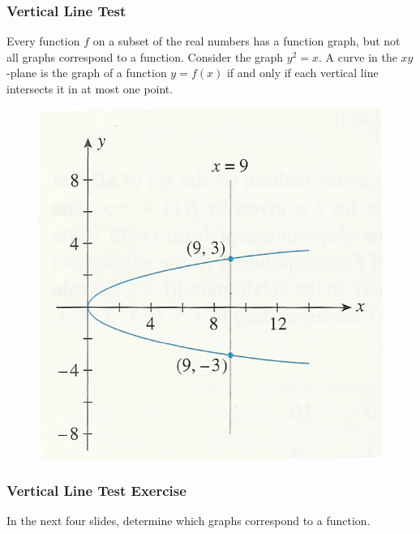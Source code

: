 \documentclass[xcolor=dvipsnames]{beamer}
\begin{document}
\begin{frame}
  \frametitle{Vertical Line Test}
Every function $f$ on a subset of the real numbers has a function
graph, but not all graphs correspond to a function. Consider the graph
$y^{2}=x$. A curve in the $xy$-plane is the graph of a function
$y=f(x)$ if and only if each vertical line intersects it in at most
one point.
  \begin{figure}[h]
    \includegraphics[scale=1]{./diagrams/fgraph-03.png}
  \end{figure}
\end{frame}

\begin{frame}
  \frametitle{Vertical Line Test Exercise}
In the next four slides, determine which graphs correspond to a function.
\end{frame}
\end{document}
